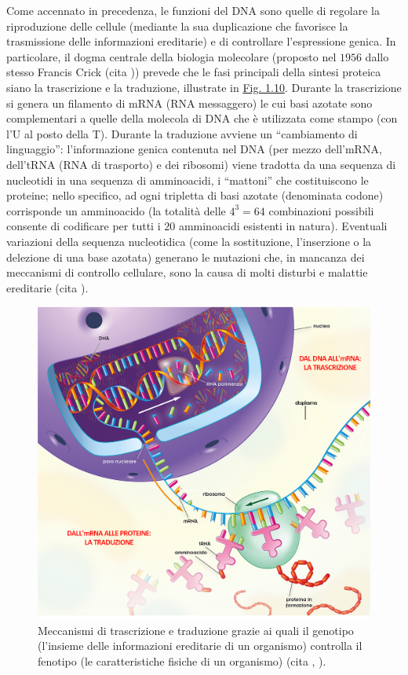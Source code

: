 \documentclass[12pt,a4paper,twoside]{report}
\begin{document}
	Come accennato in precedenza, le funzioni del DNA sono quelle di regolare la riproduzione delle cellule (mediante la sua duplicazione che favorisce la trasmissione delle informazioni ereditarie) e di controllare l'espressione genica. In particolare, il dogma centrale della biologia molecolare (proposto nel $1956$ dallo stesso Francis Crick (cita
	)) prevede che le fasi principali della sintesi proteica siano la trascrizione e la traduzione, illustrate in \hyperref[fig:dna_rna]{Fig. 1.10}. Durante la trascrizione si genera un filamento di mRNA (RNA messaggero) le cui basi azotate sono complementari a quelle della molecola di DNA che è utilizzata come stampo (con l'U al posto della T). Durante la traduzione avviene un ``cambiamento di linguaggio'': l'informazione genica contenuta nel DNA (per mezzo dell'mRNA, dell'tRNA (RNA di trasporto) e dei ribosomi) viene tradotta da una sequenza di nucleotidi in una sequenza di amminoacidi, i ``mattoni'' che costituiscono le proteine; nello specifico, ad ogni tripletta di basi azotate (denominata codone) corrisponde un amminoacido (la totalità delle $4^3=64$ combinazioni possibili consente di codificare per tutti i $20$ amminoacidi esistenti in natura). Eventuali variazioni della sequenza nucleotidica (come la sostituzione, l'inserzione o la delezione di una base azotata) generano le mutazioni che, in mancanza dei meccanismi di controllo cellulare, sono la causa di molti disturbi e malattie ereditarie (cita
	).
	\begin{figure}[H]
		\centering
		\includegraphics[width=0.9\linewidth]{dna_rna.jpg}
		\caption{Meccanismi di trascrizione e traduzione grazie ai quali il genotipo (l'insieme delle informazioni ereditarie di un organismo) controlla il fenotipo (le caratteristiche fisiche di un organismo) (cita
			,
			).}
		\label{fig:dna_rna}
	\end{figure}
\end{document}
